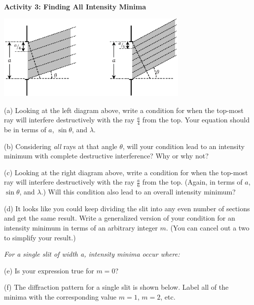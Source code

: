\pagebreak[3]
\textbf{Activity 3: Finding All Intensity Minima}


\vspace{-0.2in}
\begin{center}
\includegraphics[width=0.7\textwidth]{diffraction_of_light/fourths_and_sixths.eps}
\end{center}
\vspace{-0.2in}

(a) Looking at the left diagram above, write a condition for when the top-most ray will interfere destructively with the ray $\frac{a}{4}$ from the top.  Your equation should be in terms of $a$, $\sin \theta$, and $\lambda$.  
\answerspace{0.4in}

(b) Considering \textit{all} rays at that angle $\theta$, will your condition lead to an intensity minimum with complete destructive interference?  Why or why not?
\answerspace{0.4in}

(c) Looking at the right diagram above, write a condition for when the top-most ray will interfere destructively with the ray $\frac{a}{6}$ from the top.  (Again, in terms of $a$, $\sin \theta$, and $\lambda$.)  Will this condition also lead to an overall intensity minimum?
\answerspace{0.4in}

(d) It looks like you could keep dividing the slit into any even number of sections and get the same result.  Write a generalized version of your condition for an intensity minimum in terms of an arbitrary integer $m$.  (You can cancel out a two to simplify your result.)

\answerspace{0.1in}
\hspace{0.8in}\textit{For a single slit of width \textit{a}, intensity \textit{minima} occur where: }
\answerspace{0.1in}

(e) Is your expression true for $m=0$?
\answerspace{0.4in}

(f) The diffraction pattern for a single slit is shown below.  Label all of the minima with the corresponding value $m=1$, $m=2$, etc.  
\label{fraunhofer_graph}

